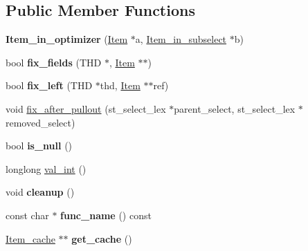 \subsection*{Public Member Functions}
\begin{DoxyCompactItemize}
\item 
\mbox{\label{classItem__in__optimizer_ab1121b9bd7660aa517c6e1a23389841c}} 
{\bfseries Item\+\_\+in\+\_\+optimizer} (\mbox{\hyperlink{classItem}{Item}} $\ast$a, \mbox{\hyperlink{classItem__in__subselect}{Item\+\_\+in\+\_\+subselect}} $\ast$b)
\item 
\mbox{\label{classItem__in__optimizer_ae3b3c07b41aef12ddba3b37d15e3b2cd}} 
bool {\bfseries fix\+\_\+fields} (T\+HD $\ast$, \mbox{\hyperlink{classItem}{Item}} $\ast$$\ast$)
\item 
\mbox{\label{classItem__in__optimizer_abaf7a4fa49ad9c50e229050cfa2d18d9}} 
bool {\bfseries fix\+\_\+left} (T\+HD $\ast$thd, \mbox{\hyperlink{classItem}{Item}} $\ast$$\ast$ref)
\item 
void \mbox{\hyperlink{classItem__in__optimizer_aeac1cb56fd617d7cebee1d792b02ba1a}{fix\+\_\+after\+\_\+pullout}} (st\+\_\+select\+\_\+lex $\ast$parent\+\_\+select, st\+\_\+select\+\_\+lex $\ast$removed\+\_\+select)
\item 
\mbox{\label{classItem__in__optimizer_ab8681df87072f6792eeb23056a8b4b28}} 
bool {\bfseries is\+\_\+null} ()
\item 
longlong \mbox{\hyperlink{classItem__in__optimizer_a24ae21b54394fd097a1b9ec9fd812bd9}{val\+\_\+int}} ()
\item 
\mbox{\label{classItem__in__optimizer_a6b5861d9a68a5b6aeb160e32befa3952}} 
void {\bfseries cleanup} ()
\item 
\mbox{\label{classItem__in__optimizer_af85c297c24fcea04b05fecbad5d94cd1}} 
const char $\ast$ {\bfseries func\+\_\+name} () const
\item 
\mbox{\label{classItem__in__optimizer_aee053a2da640c0368afe28e33f06ebbb}} 
\mbox{\hyperlink{classItem__cache}{Item\+\_\+cache}} $\ast$$\ast$ {\bfseries get\+\_\+cache} ()
$$
\end{DoxyCompactItemize}
